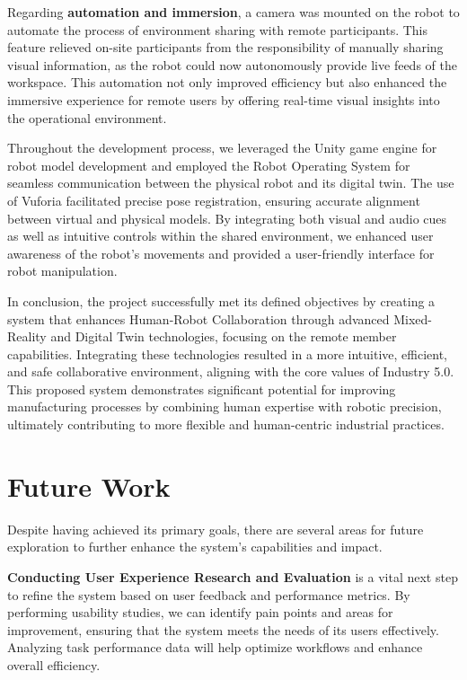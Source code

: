 Regarding \textbf{automation and immersion}, a camera was mounted on the robot to automate the process of environment sharing with remote participants. This feature relieved on-site participants from the responsibility of manually sharing visual information, as the robot could now autonomously provide live feeds of the workspace. This automation not only improved efficiency but also enhanced the immersive experience for remote users by offering real-time visual insights into the operational environment.

Throughout the development process, we leveraged the Unity game engine for robot model development and employed the Robot Operating System for seamless communication between the physical robot and its digital twin. The use of Vuforia facilitated precise pose registration, ensuring accurate alignment between virtual and physical models. By integrating both visual and audio cues as well as intuitive controls within the shared environment, we enhanced user awareness of the robot's movements and provided a user-friendly interface for robot manipulation.

In conclusion, the project successfully met its defined objectives by creating a system that enhances Human-Robot Collaboration through advanced Mixed-Reality and Digital Twin technologies, focusing on the remote member capabilities. Integrating these technologies resulted in a more intuitive, efficient, and safe collaborative environment, aligning with the core values of Industry 5.0. This proposed system demonstrates significant potential for improving manufacturing processes by combining human expertise with robotic precision, ultimately contributing to more flexible and human-centric industrial practices.

\section{Future Work}

Despite having achieved its primary goals, there are several areas for future exploration to further enhance the system's capabilities and impact.

\textbf{Conducting User Experience Research and Evaluation} is a vital next step to refine the system based on user feedback and performance metrics. By performing usability studies, we can identify pain points and areas for improvement, ensuring that the system meets the needs of its users effectively. Analyzing task performance data will help optimize workflows and enhance overall efficiency.

